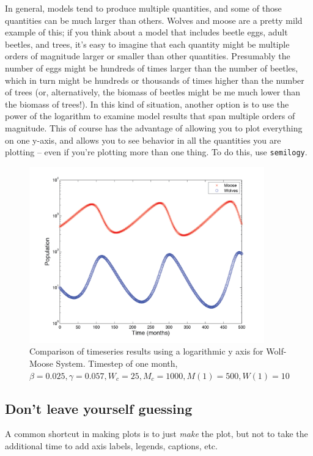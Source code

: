 In general, models tend to produce multiple quantities, and some of those quantities can be much larger than others.  Wolves and moose are a pretty mild example of this; if you think about a model that includes beetle eggs, adult beetles, and trees, it's easy to imagine that each quantity might be multiple orders of magnitude larger or smaller than other quantities. Presumably the number of eggs might be  hundreds of times larger than the number of beetles, which in turn might be hundreds or thousands  of times higher than the number of trees (or, alternatively, the biomass of beetles might be me much lower than the biomass of trees!).  In this kind of situation, another option is to use the power of the logarithm to examine model results that span multiple orders of magnitude.  This of course has the advantage of allowing you to plot everything on one y-axis, and allows you to see behavior in all the quantities you are plotting -- even if you're plotting more than one thing.  To do this, use {\tt semilogy}.

\begin{figure}[h!]
\includegraphics[width=4in]{figs/LogarithmicWolfMooseTimeSeries}
\caption{Comparison of timeseries results using a logarithmic y axis for Wolf-Moose System. Timestep of one month,   $\beta = 0.025, \gamma = 0.057, W_c = 25, M_c=1000, M(1) = 500, W(1) = 10$}
\end{figure}

\subsection{Don't leave yourself guessing}

A common shortcut in making plots is to just {\it make} the plot, but not to take the additional time to add axis labels, legends, captions, etc.  

